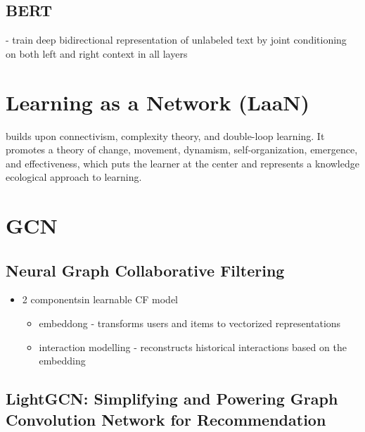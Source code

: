\documentclass{report}
\begin{document}
\section{BERT}
- train deep bidirectional representation of unlabeled text by joint conditioning on both left and right context in all layers

\chapter{Learning as a Network (LaaN)}
builds upon connectivism, complexity theory, and double-loop learning. It promotes a theory of change, movement, dynamism, self-organization, emergence, and effectiveness, which puts the learner at the center and represents a knowledge ecological approach to learning. 


\chapter{GCN}
\section{Neural Graph Collaborative Filtering}
\begin{itemize}
    \item 2 componentsin learnable CF model
    \begin{itemize}
        \item embeddong - transforms users and items to vectorized representations
        \item interaction modelling - reconstructs historical interactions based on the embedding
    \end{itemize}
\end{itemize}
\section{LightGCN: Simplifying and Powering Graph Convolution Network for Recommendation}
\end{document}
